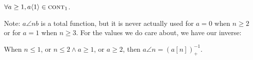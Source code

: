 \begin{col} \label{col: inv-hyperop-1-contr1}
$\forall a \ge 1, a\langle 1\rangle \in \text{\scshape{cont}}_1$.
\end{col}
Note: $a\angle{n}b$ is a total function, but it is never actually used for $a = 0$ when $n \ge 2$ or for $a=1$ when $n \ge 3$. For the values
we do care about, we have our inverse:
\begin{thm} \label{thm: inv-hyperop-correct}
When $n\le 1$, or $n \le 2 \wedge a\ge 1$, or $a\ge 2$, then
$a\angle{n} = \left(a[n]\right)^{-1}_+$.
\end{thm}
